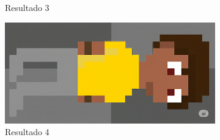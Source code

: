 \begin{figure}[htbp]
\begin{subfigure}{0.23\linewidth}
        \caption{\small Resultado 3}
        \label{fig:geminiPro15c}
    \end{subfigure}
    \begin{subfigure}{0.23\linewidth}
        \includegraphics[width=1\linewidth]{figs/geminiPro/chat11/1res4.PNG}
        \caption{\small Resultado 4}
        \label{fig:geminiPro15d}
    \end{subfigure}
    \begin{subfigure}{0.23\linewidth}

\end{subfigure}
\end{figure}
